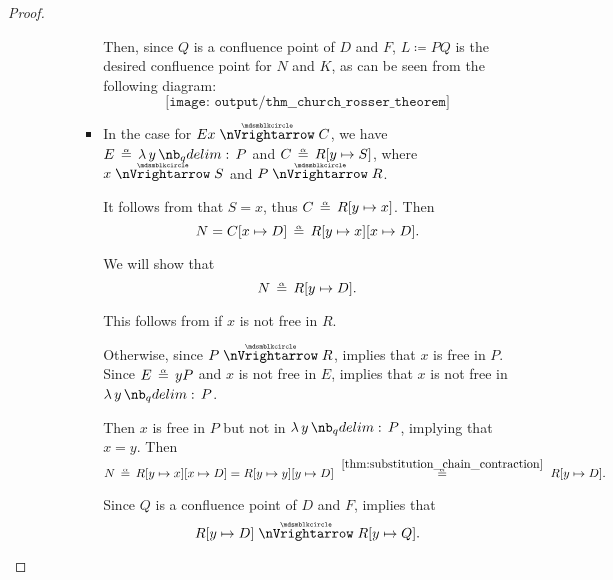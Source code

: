 \begin{proof}
\begin{itemize}
\begin{itemize}
\begin{itemize}
\begin{itemize}
          Then, since \( Q \) is a confluence point of \( D \) and \( F \), \( L \coloneqq PQ \) is the desired confluence point for \( N \) and \( K \), as can be seen from the following diagram:
          \begin{equation*}
            \texttt{[image: output/thm\_\_church\_rosser\_theorem]}
          \end{equation*}

          \item In the case  for \( Ex \ppred C \), we have \( E \aequiv \qabs y P \) and \( C \aequiv R[y \mapsto S] \), where \( x \ppred S \) and \( P \ppred R \).

          It follows from  that \( S = x \), thus \( C \aequiv R[y \mapsto x] \). Then
          \begin{equation*}
            N = C[x \mapsto D] \aequiv R[y \mapsto x][x \mapsto D].
          \end{equation*}

          We will show that
          \begin{equation*}
            N \aequiv R[y \mapsto D].
          \end{equation*}

          This follows from  if \( x \) is not free in \( R \).

          Otherwise, since \( P \ppred R \),  implies that \( x \) is free in \( P \). Since \( E \aequiv y P \) and \( x \) is not free in \( E \),  implies that \( x \) is not free in \( \qabs y P \).

          Then \( x \) is free in \( P \) but not in \( \qabs y P \), implying that \( x = y \). Then
          \begin{equation*}
            N
            \aequiv
            R[y \mapsto x][x \mapsto D]
            =
            R[y \mapsto y][y \mapsto D]
            \reloset {\ref{thm:substitution_chain_contraction}} \aequiv
            R[y \mapsto D].
          \end{equation*}

          Since \( Q \) is a confluence point of \( D \) and \( F \),  implies that
          \begin{equation*}
            R[y \mapsto D] \ppred R[y \mapsto Q].
          \end{equation*}


\end{itemize}
\end{itemize}
\end{itemize}
\end{itemize}
\end{proof}

